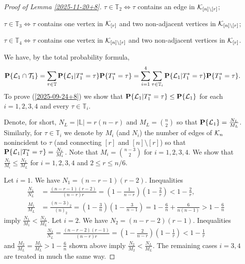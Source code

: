 \documentclass[11pt, a4paper]{article}
\newcommand{\PP}{{\bf{P}}}
\begin{document}
\begin{proof}[Proof of Lemma \ref{2025-11-20+8}]
 $\tau\in {\mathbb T}_2\Leftrightarrow \tau$ contains an 
 edge in ${\cal K}_{[n]\setminus[r]}$;
 
 
 $\tau\in {\mathbb T}_3\Leftrightarrow \tau$ contains one vertex in 
 ${\cal K}_{[r]}$ and two non-adjacent vertices in ${\cal K}_{[n]\setminus[r]}$;
 
 $\tau\in {\mathbb T}_4\Leftrightarrow \tau$ contains one vertex in 
  ${\cal K}_{[n]\setminus[r]}$
   and two non-adjacent vertices in ${\cal K}_{[r]}$.
 
 
 We have, by the total probability formula,
 \begin{align*}
 \PP\{{\cal L}_1\cap {\cal T}_1\}
 &
 =
 \sum_{\tau\in{\mathbb T}}
 \PP\{{\cal L}_1|T^*_1=\tau\}
  \PP\{T^*_1=\tau\}
  =
\sum_{i=1}^4\sum_{\tau\in{\mathbb T}_i}
 \PP\{{\cal L}_1|T^*_1=\tau\}
  \PP\{T^*_1=\tau\}.
 \end{align*}
To prove (\ref{2025-09-24+8}) we show that 
$\PP\{{\cal L}_1|T^*_1=\tau\}
 \le \PP\{{\cal L}_1\}$
 for each $i=1,2,3,4$
 and every $\tau\in {\mathbb T}_i$.
 
Denote, for short, $N_L=|{\mathbb L}|=r(n-r)$ and $M_L=\binom{n}{2}$ so that   $\PP\{{\cal L}_1\}=\frac{N_L}{M_L}$. 
Similarly, for $\tau\in{\mathbb T}_i$ we denote
by $M_i$ (and $N_i$) 
the number of edges of ${\cal K}_n$ nonincident to $\tau$ (and connecting $[r]$ and $[n]\setminus[r]$) so that
$\PP\{{\cal L}_1|T^*_1=\tau\}
=\frac{N_i}{M_i}$.
Note that 
 $M_i=\binom{n-3}{2}$ for $i=1,2,3,4$. 
 We show that 
$\frac{N_i}{M_i}\le \frac{N_L}{M_L}$ for 
$i=1,2,3,4$ and $2\le r\le n/6$.

Let $i=1$. We have  
      $N_1=(n-r-1)(r-2)$. Inequalities 
\begin{align*}
\frac{N_1}{N_L}
&
=
\frac{(n-r-1)(r-2)}{(n-r)r}
=
\left(1-\frac{1}{n-r}\right)
\left(1-\frac{2}{r}\right)
< 
1-\frac{2}{r},
\\
\frac{M_1}{M_L}
&
=
\frac{(n-3)_2}{(n)_2}
=
\left(1-\frac{3}{n}\right)
\left(1-\frac{3}{n-1}\right)
=
1-\frac{6}{n}+\frac{6}{n(n-1)}
>
1-\frac{6}{n}
\end{align*}
imply 
$
\frac{N_1}{M_1}
<
\frac{N_L}{M_L}$.
Let $i=2$.  
We have   $N_2=(n-r-2)(r-1)$. Inequalities 
\begin{align*}
\frac{N_2}{N_L}
=
\frac{(n-r-2)(r-1)}{(n-r)r}
=
\left(1-\frac{2}{n-r}\right)
\left(1-\frac{1}{r}\right)
< 
1-\frac{1}{r}
\end{align*}
and 
$\frac{M_2}{M_L}
=
\frac{M_1}{M_L}
>
1-\frac{6}{n}
$
shown above imply
$\frac{N_2}{M_2}
<
\frac{N_L}{M_L}$.
The remaining cases $i=3,4$ are treated  in much the same 
way. 











\end{proof}
\end{document}
